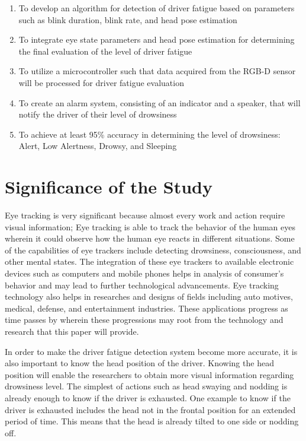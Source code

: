 \begin{enumerate}
	
	\item To develop an algorithm for detection of driver fatigue based on parameters such as blink duration, blink rate, and head pose estimation
	
	\item To integrate eye state parameters and head pose estimation for determining the final evaluation of the level of driver fatigue
	
	\item To utilize a microcontroller such that data acquired from the RGB-D sensor will be processed for driver fatigue evaluation
	
	\item To create an alarm system, consisting of an indicator and a speaker, that will notify the driver of their level of drowsiness
	
	\item To achieve at least 95\% accuracy in determining the level of drowsiness: Alert, Low Alertness, Drowsy, and Sleeping
	
	
\end{enumerate}



\section{Significance of the Study}

Eye tracking is very significant because almost every work and action require visual information; Eye tracking is able to track the behavior of the human eyes wherein it could observe how the human eye reacts in different situations. Some of the capabilities of eye trackers include detecting drowsiness, consciousness, and other mental states. The integration of these eye trackers to available electronic devices such as computers and mobile phones helps in analysis of consumer’s behavior and may lead to further technological advancements. Eye tracking technology also helps in researches and designs of fields including auto motives, medical, defense, and entertainment industries. These applications progress as time passes by wherein these progressions may root from the technology and research that this paper will provide.

In order to make the driver fatigue detection system become more accurate, it is also important to know the head position of the driver. Knowing the head position will enable the researchers to obtain more visual information regarding drowsiness level. The simplest of actions such as head swaying and nodding is already enough to know if the driver is exhausted. 
One example to know if the driver is exhausted includes the head not in the frontal position for an extended period of time. This means that the head is already tilted to one side or nodding off.

